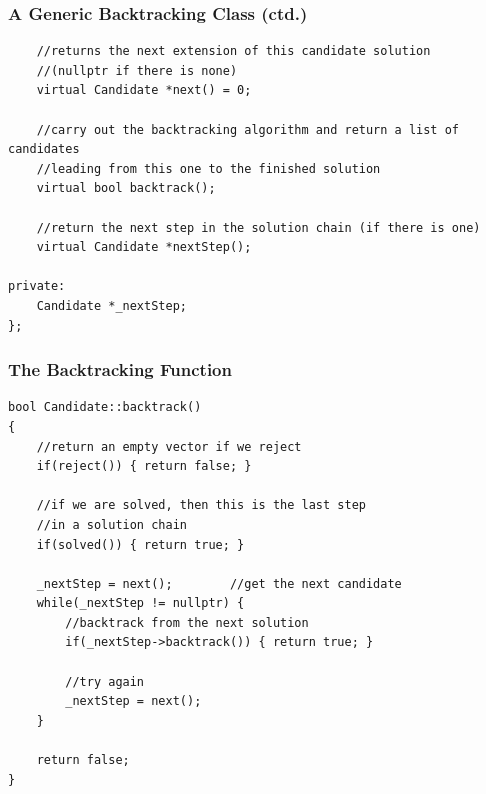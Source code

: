 \documentclass{beamer}
\begin{document}
\begin{frame}[fragile]
    \frametitle{A Generic Backtracking Class (ctd.)}
\begin{verbatim}
    //returns the next extension of this candidate solution 
    //(nullptr if there is none)
    virtual Candidate *next() = 0;
   
    //carry out the backtracking algorithm and return a list of candidates
    //leading from this one to the finished solution
    virtual bool backtrack();

    //return the next step in the solution chain (if there is one)
    virtual Candidate *nextStep();

private:
    Candidate *_nextStep;
};
    \end{verbatim}
\end{frame}

\begin{frame}[fragile]
    \frametitle{The Backtracking Function}
    {\scriptsize
    \begin{verbatim}
bool Candidate::backtrack()
{
    //return an empty vector if we reject
    if(reject()) { return false; }
    
    //if we are solved, then this is the last step
    //in a solution chain
    if(solved()) { return true; }
    
    _nextStep = next();        //get the next candidate
    while(_nextStep != nullptr) {
        //backtrack from the next solution
        if(_nextStep->backtrack()) { return true; }
        
        //try again
        _nextStep = next();
    }
    
    return false;
}
\end{verbatim}
}
\end{frame}
\end{document}
